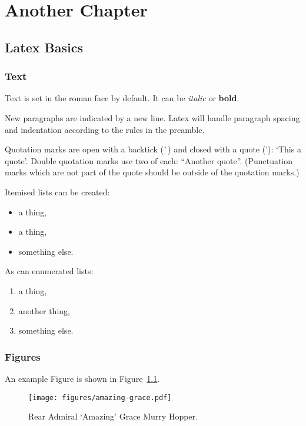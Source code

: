\chapter{Another Chapter} %
\label{cha:another_chapter}

\section{Latex Basics} %
\label{sec:latex_basics}

\subsection{Text} %
\label{sub:text}

Text is set in the roman face by default. It can be \textit{italic} or \textbf{bold}.

New paragraphs are indicated by a new line. Latex will handle paragraph spacing and indentation according to the rules in the preamble.

Quotation marks are open with a backtick (\`{}) and closed with a quote (\'{}): `This a quote'. Double quotation marks use two of each: ``Another quote''. (Punctuation marks which are not part of the quote should be outside of the quotation marks.)

Itemised lists can be created:

\begin{itemize}
  \item a thing,
  \item a thing,
  \item something else.
\end{itemize}

As can enumerated lists:

\begin{enumerate}
  \item a thing,
  \item another thing,
  \item something else.
\end{enumerate}

\subsection{Figures} %
\label{sub:figures}

An example Figure is shown in Figure~\ref{fig:Figures_amazing_grace}.

\begin{figure}[h]
  \texttt{[image: figures/amazing-grace.pdf]}
  \caption{Rear Admiral `Amazing' Grace Murry Hopper.}
  \label{fig:Figures_amazing_grace}
\end{figure}

